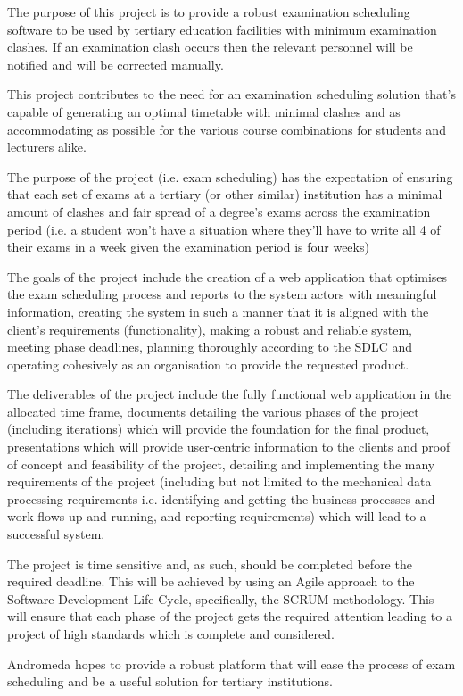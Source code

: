 \documentclass{article}
\begin{document}
The purpose of this project is to provide a robust examination scheduling software to be used by tertiary education facilities with minimum examination clashes. If an examination clash occurs then the relevant personnel will be notified and will be corrected manually.

This project contributes to the need for an examination scheduling solution that's capable of generating an optimal timetable with minimal clashes and as accommodating as possible for the various course combinations for students and lecturers alike.

The purpose of the project (i.e. exam scheduling) has the expectation of ensuring that each set of exams at a tertiary (or other similar) institution has a minimal amount of clashes and fair spread of a degree's exams across the examination period (i.e. a student won't have a situation where they'll have to write all 4 of their exams in a week given the examination period is four weeks)

The goals of the project include the creation of a web application that optimises the exam scheduling process and reports to the system actors with meaningful information, creating the system in such a manner that it is aligned with the client's requirements (functionality), making a robust and reliable system, meeting phase deadlines, planning thoroughly according to the SDLC and operating cohesively as an organisation to provide the requested product.

The deliverables of the project include the fully functional web application in the allocated time frame, documents detailing the various phases of the project (including iterations) which will provide the foundation for the final product, presentations which will provide user-centric information to the clients and proof of concept and feasibility of the project, detailing and implementing the many requirements of the project (including but not limited to the mechanical data processing requirements i.e. identifying and getting the business processes and work-flows up and running, and reporting requirements) which will lead to a successful system.

The project is time sensitive and, as such, should be completed before the required deadline. This will be achieved by using an Agile approach to the Software Development Life Cycle, specifically, the SCRUM methodology. This will ensure that each phase of the project gets the required attention leading to a project of high standards which is complete and considered.

Andromeda hopes to provide a robust platform that will ease the process of exam scheduling and be a useful solution for tertiary institutions.
\end{document}
